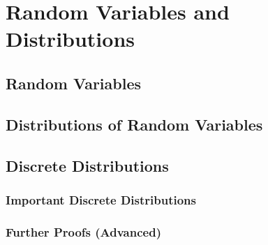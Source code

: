 \chapter{Random Variables and Distributions}\label{chap:rvar_and_dist}
\minitoc
\section{Random Variables}
\lipsum[1-3]
\section{Distributions of Random Variables}
\lipsum[4-5]
\section{Discrete Distributions}
\lipsum[6-8]
\subsection{Important Discrete Distributions}
\lipsum[9-11]
\subsection{Further Proofs (Advanced)}\label{сhap:rvar_and_dist_sec:adv}
\lipsum[12-18]